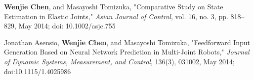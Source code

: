 \documentclass[UTF8,nofonts]{res}
\begin{document}
\begin{resume}
\begin{etaremune}[start=7]
    \item \textbf{Wenjie Chen}, and Masayoshi Tomizuka, "Comparative Study on State Estimation in Elastic Joints," \emph{Asian Journal of Control}, vol. 16, no. 3, pp. 818--829, May 2014; doi: 10.1002/asjc.755%
    \item Jonathan Asensio, \textbf{Wenjie Chen}, and Masayoshi Tomizuka, "Feedforward Input Generation Based on Neural Network Prediction in Multi-Joint Robots," \emph{Journal of Dynamic Systems, Measurement, and Control}, 136(3), 031002, May 2014;   doi:10.1115/1.4025986
    \end{etaremune}


\end{resume}
\end{document}
